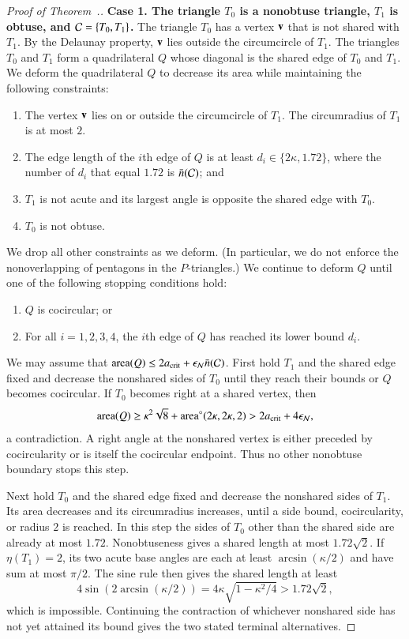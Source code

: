 \begin{proof}[Proof of Theorem~.]
{\bf Case 1. The triangle $T_0$ is a nonobtuse triangle, $T_1$ is obtuse, and
  $\mathcal C=\{T_0,T_1\}$.}  The triangle $T_0$ has a vertex ${\mathbf v}$ that is
not shared with $T_1$.  By the Delaunay property, ${\mathbf v}$ lies outside
the circumcircle of $T_1$.  The triangles $T_0$ and $T_1$ form a
quadrilateral $Q$ whose diagonal is the shared edge of $T_0$ and
$T_1$.  We deform the quadrilateral $Q$ to decrease its area while
maintaining the following constraints:
\begin{enumerate}
\item The vertex ${\mathbf v}$ lies on or outside the circumcircle of
  $T_1$. The circumradius of $T_1$ is at most $2$.
\item The edge length of the $i$th edge of $Q$ is at least
  $d_i\in\{2\kappa,1.72\}$,
where  the number of $d_i$ that equal $1.72$ is $\bar n(\mathcal C)$; and
\item $T_1$ is not acute and its largest angle is opposite
  the shared edge with $T_0$.
\item $T_0$ is not obtuse.
\end{enumerate}
We drop all other constraints as we deform. (In particular, we do not
enforce the nonoverlapping of pentagons in the $P$-triangles.)  We
continue to deform $Q$ until one of the following stopping conditions hold:
\begin{enumerate}
\item $Q$ is cocircular; or
\item For all $i=1,2,3,4$, the $i$th edge of $Q$ has reached its lower
  bound $d_i$.
\end{enumerate}
We may assume that ${\operatorname{area}}(Q)\le2a_\text{crit}+\epsilon_{\mathcal N}\bar n(\mathcal C)$. First hold $T_1$ and the shared edge fixed and decrease the nonshared sides of $T_0$ until they reach their bounds or $Q$ becomes cocircular. If $T_0$ becomes right at a shared vertex, then
\[
{\operatorname{area}}(Q)\ge\kappa^2\sqrt8+{\operatorname{area}}^\circ(2\kappa,2\kappa,2)>2a_\text{crit}+4\epsilon_{\mathcal N},
\]
a contradiction. A right angle at the nonshared vertex is either preceded by cocircularity or is itself the cocircular endpoint. Thus no other nonobtuse boundary stops this step.

Next hold $T_0$ and the shared edge fixed and decrease the nonshared sides of $T_1$. Its area decreases and its circumradius increases, until a side bound, cocircularity, or radius $2$ is reached. In this step the sides of $T_0$ other than the shared side are already at most $1.72$. Nonobtuseness gives a shared length at most $1.72\sqrt2$. If $\eta(T_1)=2$, its two acute base angles are each at least $\arcsin(\kappa/2)$ and have sum at most $\pi/2$. The sine rule then gives the shared length at least
\[
4\sin(2\arcsin(\kappa/2))=4\kappa\sqrt{1-\kappa^2/4}>1.72\sqrt2,
\]
which is impossible. Continuing the contraction of whichever nonshared side has not yet attained its bound gives the two stated terminal alternatives.


\end{proof}
